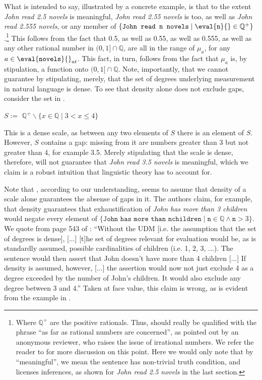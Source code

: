 \documentclass[output=paper]{langscibook}
\begin{document}
\noindent What  is intended to say, illustrated by a concrete example, is that to the extent \textit{John read 2.5 novels} is meaningful, \textit{John read 2.55 novels} is too, as well as \textit{John read 2.555 novels}, or any member of $\{\texttt{John read n novels} \mid \eval{\texttt{n}}{} \in \mathbb{Q}^+\}$.\footnote{Where $\mathbb{Q}^+$ are the positive rationals. Thus,  should really be qualified with the phrase ``as far as rational numbers are concerned'', as pointed out by an anonymous reviewer, who raises the issue of irrational numbers. We refer the reader to  for more discussion on this point. Here we would only note that by ``meaningful'', we mean the sentence has non-trivial truth condition, and licenses inferences, as shown for \textit{John read 2.5 novels} in the last section.} This follows from the fact that 0.5, as well as 0.55, as well as 0.555, as well as any other rational number in $(0,1] \cap\mathbb{Q}$, are all in the range of $\mu_a$, for any $a \in \eval{\texttt{novels}}{}_{at}$. This fact, in turn, follows from the fact that $\mu_a$ is, by stipulation, a function onto $(0,1] \cap\mathbb{Q}$. Note, importantly, that we cannot guarantee  by stipulating, merely, that the set of degrees underlying measurement in natural language is dense. To see that density alone does not exclude gaps, consider the set in .

\ea  
$S :=$ $\mathbb{Q}^+ \backslash \{x \in \mathbb{Q} \mid 3 < x \leq 4\}$
\label{hai-tri:dense+gap}
\z

\noindent This is a dense scale, as between any two elements of $S$ there is an element of $S$. However, $S$ contains a gap: missing from it are numbers greater than 3 but not greater than 4, for example 3.5. Merely stipulating that the scale is dense, therefore, will not guarantee that \textit{John read 3.5 novels} is meaningful, which we claim is a robust intuition that linguistic theory has to account for.

Note that \citet{foxhackl2006universal}, according to our understanding, seems to assume that density of a scale alone guarantees the absense of gaps in it. The authors claim, for example, that density guarantees that exhaustification of \textit{John has more than 3 children} would negate every element of $\{\texttt{John has more than n}\allowbreak \texttt{children} \mid \texttt{n} \in \mathbb{Q} \wedge \texttt{n} > 3\}$. We quote from page 543 of \citet{foxhackl2006universal}: ``Without the UDM [i.e. the assumption that the set of degrees is dense], [...] [t]he set of degrees relevant for evaluation would be, as is standardly assumed, possible cardinalities of children (i.e. 1, 2, 3, ...). The sentence would then assert that John doesn't have more than 4 children [...] If density is assumed, however, [...] the assertion would now not just exclude 4 as a degree exceeded by the number of John’s children. It would also exclude any degree between 3 and 4.'' Taken at face value, this claim is wrong, as is evident from the example in . 
\end{document}
